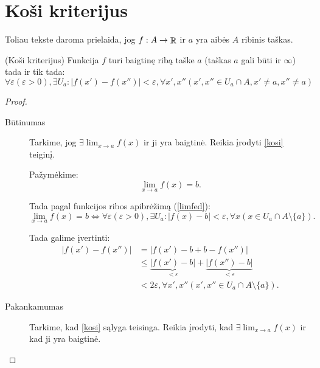 \section{Koši kriterijus}

\begin{note}
  Toliau tekste daroma prielaida, jog $f: A \to \mathop{\mathbb{R}}$ ir $a$ yra 
  aibės $A$ ribinis taškas.
\end{note}

\begin{prop}
  (Koši kriterijus) Funkcija $f$ turi baigtinę ribą taške $a$
  (taškas $a$ gali būti ir $\infty$) tada ir tik tada:
  \begin{equation}
    \forall \varepsilon (\varepsilon > 0), \exists U_{a} :
    | f(x') - f(x'') | < \varepsilon,
    \forall x', x'' (x',x'' \in U_{a} \cap A, x' \neq a, x'' \neq a)
    \label{kosi}
  \end{equation}

  \begin{proof}
    \hfill \\
    \begin{description}
      \item[Būtinumas] Tarkime, jog $\exists \lim _{x \to a} f(x)$ ir ji
        yra baigtinė. Reikia įrodyti \ref{kosi} teiginį.

        Pažymėkime:
        \begin{equation*}
          \lim _{x \to a} f(x) = b.
        \end{equation*}

        Tada pagal funkcijos ribos apibrėžimą (\ref{limfed}):
        \begin{equation*}
          \lim _{x \to a} f(x) = b \iff 
          \forall \varepsilon (\varepsilon > 0), \exists U_{a}:
          | f(x) - b | < \varepsilon, 
          \forall x (x \in U_{a} \cap A \setminus \{a\}).
        \end{equation*}

        Tada galime įvertinti:
        \begin{align*}
          | f(x') - f(x'') | &= | f(x') - b + b - f(x'') | \\
          &\leq \underbrace{| f(x') - b |}_{ < \varepsilon } +
          \underbrace{| f(x'') - b |}_{ < \varepsilon } \\
          &< 2 \varepsilon, \forall x',x'' 
          (x',x'' \in U_{a} \cap A \setminus \{a\}).
        \end{align*}

      \item[Pakankamumas] Tarkime, kad \ref{kosi} sąlyga teisinga. Reikia 
        įrodyti, kad $\exists \lim _{x \to a} f(x)$ ir kad ji yra baigtinė.


\end{description}
\end{proof}
\end{prop}
